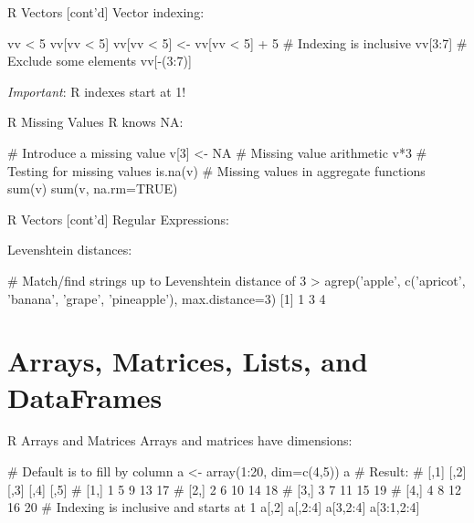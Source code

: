 \documentclass[ignorenonframetext,xcolor=x11names]{beamer}
\begin{document}
\begin{frame}[fragile]{R Vectors \small [cont'd]}
Vector indexing:
\begin{Rcode}
vv < 5
vv[vv < 5]
vv[vv < 5] <- vv[vv < 5] + 5
# Indexing is inclusive
vv[3:7]
# Exclude some elements
vv[-(3:7)]
\end{Rcode}

\emph{Important}: R indexes start at 1!

\end{frame}

\begin{frame}[fragile]{R Missing Values}
R knows NA:
\begin{Rcode}
# Introduce a missing value
v[3] <- NA
# Missing value arithmetic
v*3
# Testing for missing values
is.na(v)
# Missing values in aggregate functions
sum(v)
sum(v, na.rm=TRUE)
\end{Rcode}
\end{frame}

\begin{frame}[fragile]{R Vectors \small [cont'd]}
Regular Expressions:
\footnotesize
{}
\normalsize
Levenshtein distances:
\footnotesize
\begin{Rcode}
# Match/find strings up to Levenshtein distance of 3
> agrep('apple', 
    c('apricot', 'banana', 'grape', 'pineapple'), 
    max.distance=3)
[1] 1 3 4
\end{Rcode}
\end{frame}

\section{Arrays, Matrices, Lists, and DataFrames}

\begin{frame}[fragile]{R Arrays and Matrices}
Arrays and matrices have dimensions:
\begin{Rcode}
# Default is to fill by column
a <- array(1:20, dim=c(4,5))
a
# Result:
#      [,1] [,2] [,3] [,4] [,5]
# [1,]    1    5    9   13   17
# [2,]    2    6   10   14   18
# [3,]    3    7   11   15   19
# [4,]    4    8   12   16   20
# Indexing is inclusive and starts at 1
a[,2]
a[,2:4]
a[3,2:4]
a[3:1,2:4]
\end{Rcode}
\end{frame}
\end{document}
